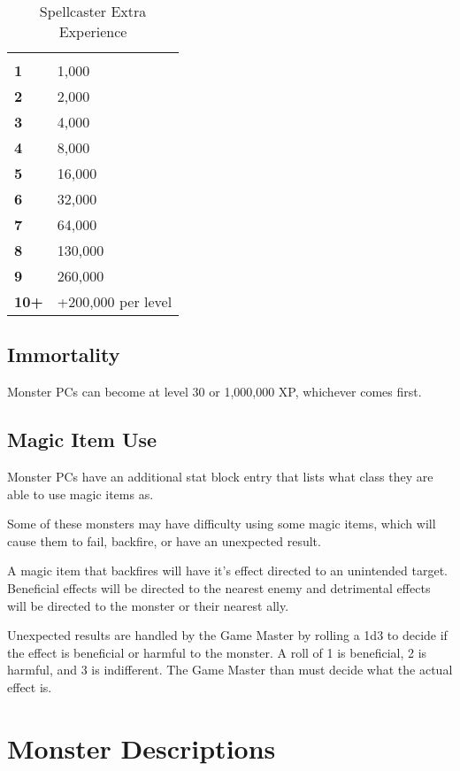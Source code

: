 \begin{multicols*}{2}
\begin {table}[H]
	\caption{Spellcaster Extra Experience}\label{tab:Spellcaster Extra Experience}
  \begin{tabularx}{\columnwidth}{>{\bfseries}YY}
	 & \\
	1 & 1,000\\
	2 & 2,000\\
	3 & 4,000\\
	4 & 8,000\\
	5 & 16,000\\
	6 & 32,000\\
	7 & 64,000\\
	8 & 130,000\\
	9 & 260,000\\
	10+ & +200,000 per level
  \end {tabularx}
\end {table}

\subsection{Immortality}
Monster PCs can become  at level 30 or 1,000,000 XP, whichever comes first.

\subsection{Magic Item Use}
Monster PCs have an additional stat block entry that lists what class they are able to use magic items as.

Some of these monsters may have difficulty using some magic items, which will cause them to fail, backfire, or have an unexpected result.

A magic item that backfires will have it's effect directed to an unintended target. Beneficial effects will be directed to the nearest enemy and detrimental effects will be directed to the monster or their nearest ally.

Unexpected results are handled by the Game Master by rolling a 1d3 to decide if the effect is beneficial or harmful to the monster. A roll of 1 is beneficial, 2 is harmful, and 3 is indifferent. The Game Master than must decide what the actual effect is.

\section{Monster Descriptions}\label{sec:Monster Descriptions}

\end{multicols*}
